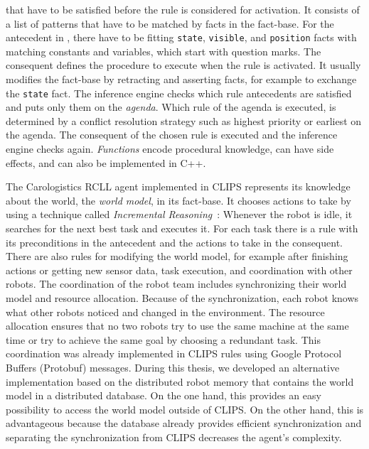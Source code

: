 that have to be satisfied before the rule is considered for activation.
It consists of a list of patterns that have to be matched by facts in
the fact-base. For the antecedent in , there
have to be fitting \texttt{state}, \texttt{visible}, and
\texttt{position} facts with matching constants and variables, which
start with question marks. The consequent defines the procedure to execute when the rule is
activated. It usually modifies the fact-base by retracting and
asserting facts, for example to exchange the \texttt{state} fact. The
inference engine checks which rule antecedents are satisfied and puts
only them on the \emph{agenda}. Which rule of the agenda is executed,
is determined by a conflict resolution strategy such as highest
priority or earliest on the agenda. The consequent of the chosen rule
is executed and the inference engine checks again. \emph{Functions}
encode procedural knowledge, can have side effects, and can also be
implemented in C++.

The Carologistics RCLL agent implemented in CLIPS represents its
knowledge about the world, the \emph{world model}, in its
fact-base. It chooses actions to take by using a technique called
\emph{Incremental Reasoning}~\cite{CLIPS-Agent}: Whenever the robot is
idle, it searches for the next best task and executes it.  For each
task there is a rule with its preconditions in the antecedent and the
actions to take in the consequent. There are also rules for modifying
the world model, for example after finishing actions or getting new sensor
data, task execution, and coordination with other robots.  The
coordination of the robot team includes synchronizing their world
model and resource allocation. Because of the synchronization, each
robot knows what other robots noticed and changed in the
environment. The resource allocation ensures that no two robots try to
use the same machine at the same time or try to achieve the same goal by
choosing a redundant task. This coordination was already implemented
in CLIPS rules using Google Protocol Buffers (Protobuf)
messages. During this thesis, we developed an alternative
implementation based on the distributed robot memory that contains the
world model in a distributed database. On the one hand, this provides
an easy possibility to access the world model outside of CLIPS. On the
other hand, this is advantageous
because the database already provides efficient synchronization and
separating the synchronization from CLIPS decreases the
agent's complexity.

